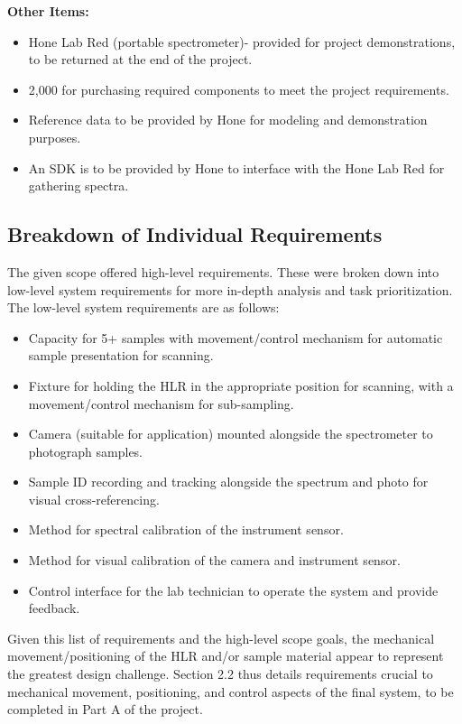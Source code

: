 \documentclass{UoNMCHA}
\numberwithin{equation}{section}
\begin{document}
\textbf{Other Items:}\\
\begin{itemize}
	\item Hone Lab Red (portable spectrometer)- provided for project demonstrations, to be returned at the end of the project.
	\item 2,000 for purchasing required components to meet the project requirements.
	\item Reference data to be provided by Hone for modeling and demonstration purposes.
	\item An SDK is to be provided by Hone to interface with the Hone Lab Red for gathering spectra.
\end{itemize}
\subsection{Breakdown of Individual Requirements}
The given scope offered high-level requirements. These were broken down into low-level system requirements for more in-depth analysis and task prioritization. The low-level system requirements are as follows:\\
\begin{itemize}
	\item Capacity for 5+ samples with movement/control mechanism for automatic sample presentation for scanning.
	\item Fixture for holding the HLR in the appropriate position for scanning, with a movement/control mechanism for sub-sampling.
	\item Camera (suitable for application) mounted alongside the spectrometer to photograph samples.
	\item Sample ID recording and tracking alongside the spectrum and photo for visual cross-referencing.
	\item Method for spectral calibration of the instrument sensor.
	\item Method for visual calibration of the camera and instrument sensor.
	\item Control interface for the lab technician to operate the system and provide feedback.
\end{itemize}
Given this list of requirements and the high-level scope goals, the mechanical movement/positioning of the HLR and/or sample material appear to represent the greatest design challenge. Section 2.2 thus details requirements crucial to mechanical movement, positioning, and control aspects of the final system, to be completed in Part A of the project.\\
\end{document}
